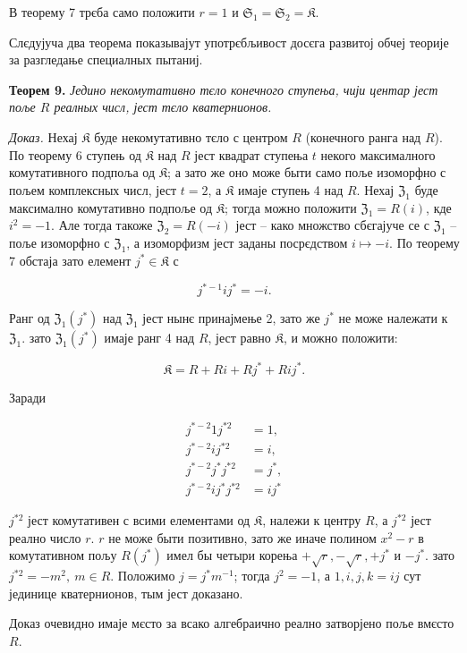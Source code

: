 \documentclass[11pt]{article}
\begin{document}
В теорему 7 трєба само положити \(r=1\) и \(\mathfrak S_1=\mathfrak S_2=\mathfrak K\).

Слєдујуча два теорема показывајут употрєбљивост досєга развитој обчеј теорије за разгледање специалных пытаниј.

\textbf{Теорем 9.} \emph{Једино некомутативно тєло конечного ступења, чији центар јест поље \(R\) реалных числ, јест тєло кватернионов.}

\emph{Доказ.} Нехај \(\mathfrak K\) буде некомутативно тєло с центром \(R\) (конечного ранга над \(R\)). По теорему 6 ступењ од \(\mathfrak K\) над \(R\) јест квадрат ступења \(t\) некого максималного комутативного подпоља од \(\mathfrak K\); а зато же оно може быти само поље изоморфно с пољем комплексных числ, јест \(t=2\), а \(\mathfrak K\) имаје ступењ 4 над \(R\). Нехај \(\mathfrak Z_1\) буде максимално комутативно подпоље од \(\mathfrak K\); тогда можно положити \(\mathfrak Z_1=R(i)\), кде \(i^2=-1\). Але тогда такоже \(\mathfrak Z_2=R(-i)\) јест -- како множство сбєгајуче се с \(\mathfrak Z_1\) -- поље изоморфно с \(\mathfrak Z_1\), а изоморфизм јест заданы посрєдством \(i\mapsto -i\). По теорему 7 обстаја зато елемент \(j^*\in\mathfrak K\) с

\[
j^{*-1}ij^*=-i.
\]

Ранг од \(\mathfrak Z_1(j^*)\) над \(\mathfrak Z_1\) јест нынє принајмење 2, зато же \(j^*\) не може належати к \(\mathfrak Z_1\). зато \(\mathfrak Z_1(j^*)\) имаје ранг 4 над \(R\), јест равно \(\mathfrak K\), и можно положити:

\[
\mathfrak K=R+Ri+Rj^*+Rij^*.
\]

Заради

\[
\begin{aligned}
j^{*-2}1j^{*2}&=1,\\
j^{*-2}ij^{*2}&=i,\\
j^{*-2}j^*j^{*2}&=j^*,\\
j^{*-2}ij^*j^{*2}&=ij^*
\end{aligned}
\]

\(j^{*2}\) јест комутативен с всими елементами од \(\mathfrak K\), належи к центру \(R\), а \(j^{*2}\) јест реално число \(r\). \(r\) не може быти позитивно, зато же иначе полином \(x^2-r\) в комутативном пољу \(R(j^*)\) имел бы четыри корења \(+\sqrt r,-\sqrt r,+j^*\) и \(-j^*\). зато \(j^{*2}=-m^2,\ m\in R\). Положимо \(j=j^*m^{-1}\); тогда \(j^2=-1\), а \(1,i,j,k=ij\) сут јединице кватернионов, тым јест доказано.

Доказ очевидно имаје мєсто за всако алгебраично реално затворјено поље вмєсто \(R\).
\end{document}
